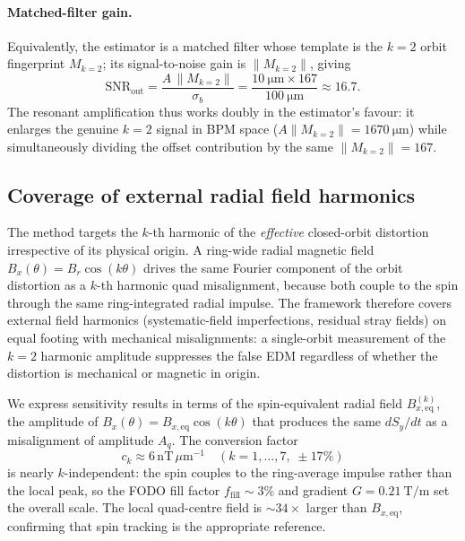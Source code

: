 \documentclass[preprint,12pt]{elsarticle}
\begin{document}
\paragraph{Matched-filter gain.} Equivalently, the estimator is a matched
filter whose template is the $k=2$ orbit fingerprint $M_{k=2}$; its
signal-to-noise gain is $\|M_{k=2}\|$, giving
\begin{equation}
\mathrm{SNR}_{\mathrm{out}}
= \frac{A\,\|M_{k=2}\|}{\sigma_b}
= \frac{\SI{10}{\micro\meter}\times167}{\SI{100}{\micro\meter}}
\approx 16.7 .
\end{equation}
The resonant amplification thus works doubly in the estimator's favour: it
enlarges the genuine $k=2$ signal in BPM space ($A\|M_{k=2}\|=\SI{1670}{\micro
\meter}$) while simultaneously dividing the offset contribution by the same
$\|M_{k=2}\|=167$.

\subsection{Coverage of external radial field harmonics}
\label{sec:bxequiv}

The method targets the $k$-th harmonic of the \emph{effective} closed-orbit
distortion irrespective of its physical origin.  A ring-wide radial magnetic
field $B_x(\theta)=B_r\cos(k\theta)$ drives the same Fourier component of
the orbit distortion as a $k$-th harmonic quad misalignment, because both
couple to the spin through the same ring-integrated radial impulse.  The
framework therefore covers external field harmonics (systematic-field
imperfections, residual stray fields) on equal footing with mechanical
misalignments: a single-orbit measurement of the $k=2$ harmonic amplitude
suppresses the false EDM regardless of whether the distortion is mechanical
or magnetic in origin.

We express sensitivity results in terms of the spin-equivalent radial
field $B_{x,\mathrm{eq}}^{(k)}$, the amplitude of $B_x(\theta)=B_{x,\mathrm{eq}}\cos(k\theta)$
that produces the same $dS_y/dt$ as a misalignment of amplitude $A_q$.
The conversion factor
\begin{equation}
c_k \approx 6\,\mathrm{nT}\,\mu\mathrm{m}^{-1} \quad (k=1,\ldots,7,\;\pm17\%)
\label{eq:ck}
\end{equation}
is nearly $k$-independent: the spin couples to the ring-average impulse
rather than the local peak, so the FODO fill factor $f_\mathrm{fill}\sim3\%$
and gradient $G=\SI{0.21}{\tesla\per\meter}$ set the overall scale.
The local quad-centre field is $\sim\!34\times$ larger than $B_{x,\mathrm{eq}}$,
confirming that spin tracking is the appropriate reference.
\end{document}
